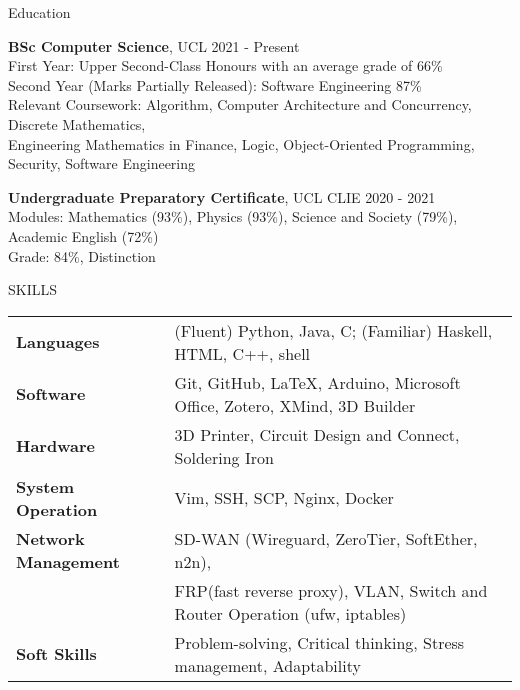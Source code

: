 \documentclass{resume} %
\begin{document}

\begin{rSection}{Education}

{\bf BSc Computer Science}, UCL \hfill {2021 - Present}\\
First Year: Upper Second-Class Honours with an average grade of 66\% \\
Second Year (Marks Partially Released): Software Engineering 87\% \\
Relevant Coursework: Algorithm, Computer Architecture and Concurrency, Discrete Mathematics, \\
Engineering Mathematics in Finance, Logic, Object-Oriented Programming, Security, Software Engineering

{\bf Undergraduate Preparatory Certificate}, UCL CLIE \hfill {2020 - 2021}\\
Modules: Mathematics (93\%), Physics (93\%), Science and Society (79\%), Academic English (72\%)\\
Grade: 84\%, Distinction


\end{rSection}

\begin{rSection}{SKILLS}

\begin{tabular}{ @{} >{\bfseries}l @{\hspace{6ex}} l }
Languages & (Fluent) Python, Java, C; (Familiar) Haskell, HTML, C++, shell
\\
Software & Git, GitHub, \LaTeX, Arduino, Microsoft Office, Zotero, XMind, 3D Builder
\\
Hardware & 3D Printer, Circuit Design and Connect, Soldering Iron
\\
System Operation & Vim, SSH, SCP, Nginx, Docker
\\
Network Management & SD-WAN (Wireguard, ZeroTier, SoftEther, n2n), \\ 
& FRP(fast reverse proxy),
VLAN, Switch and Router Operation (ufw, iptables)\\
Soft Skills & Problem-solving, Critical thinking, Stress management, Adaptability
\end{tabular}
\end{rSection}
\end{document}
